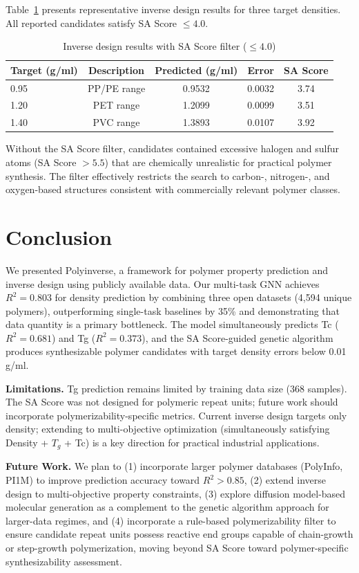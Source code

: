 \documentclass{article}
\begin{document}
Table~\ref{tab:inverse} presents representative inverse design results for
three target densities. All reported candidates satisfy SA Score $\leq 4.0$.

\begin{table}[h]
\centering
\caption{Inverse design results with SA Score filter ($\leq 4.0$)}
\label{tab:inverse}
\begin{tabular}{lcccc}
\toprule
Target (g/ml) & Description & Predicted (g/ml) & Error & SA Score \\
\midrule
0.95 & PP/PE range & 0.9532 & 0.0032 & 3.74 \\
1.20 & PET range   & 1.2099 & 0.0099 & 3.51 \\
1.40 & PVC range   & 1.3893 & 0.0107 & 3.92 \\
\bottomrule
\end{tabular}
\end{table}

Without the SA Score filter, candidates contained excessive halogen and
sulfur atoms (SA Score $> 5.5$) that are chemically unrealistic for
practical polymer synthesis. The filter effectively restricts the search
to carbon-, nitrogen-, and oxygen-based structures consistent with
commercially relevant polymer classes.

\section{Conclusion}

We presented Polyinverse, a framework for polymer property prediction
and inverse design using publicly available data.
Our multi-task GNN achieves $R^2 = 0.803$ for density prediction by combining
three open datasets (4,594 unique polymers), outperforming single-task baselines
by 35\% and demonstrating that data quantity is a primary bottleneck.
The model simultaneously predicts Tc ($R^2=0.681$) and Tg ($R^2=0.373$),
and the SA Score-guided genetic algorithm produces synthesizable polymer
candidates with target density errors below 0.01 g/ml.

\noindent\textbf{Limitations.}
Tg prediction remains limited by training data size (368 samples).
The SA Score was not designed for polymeric repeat units; future work
should incorporate polymerizability-specific metrics.
Current inverse design targets only density; extending to
multi-objective optimization (simultaneously satisfying Density + $T_g$ + Tc)
is a key direction for practical industrial applications.

\noindent\textbf{Future Work.}
We plan to (1) incorporate larger polymer databases (PolyInfo, PI1M)
to improve prediction accuracy toward $R^2 > 0.85$,
(2) extend inverse design to multi-objective property constraints,
(3) explore diffusion model-based molecular generation as a
complement to the genetic algorithm approach for larger-data regimes, and
(4) incorporate a rule-based polymerizability filter to ensure
candidate repeat units possess reactive end groups capable of
chain-growth or step-growth polymerization, moving beyond SA Score
toward polymer-specific synthesizability assessment.
\end{document}
